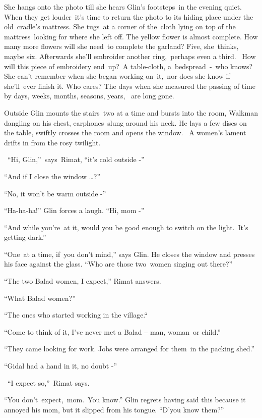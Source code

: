 \documentclass[twoside,11pt]{book}
\begin{document}
S{he hangs onto the photo till she hears Glin's footsteps\ in the
evening quiet. When }they get louder\ {it's time to return the photo
to its hiding place under the old\ cradle's mattress. She tugs\ at a corner of
the}{\ }cloth lying on top of the
mattress{\ looking for where she left off. The yellow flower is almost
complete. How many more flowers will she need}\ {to complete the
garland? Five, she\ }thinks{, maybe six. Afterwards she'll embroider
another }ring,\ p{erhaps even a third.~
}How{ will this piece of embroidery
end\ }up?{\ }A{
table{}-cloth,} a\ {bedspread\ {}-\ who knows? She can't remember when
she began working on\ }it,\ nor does she know if she'll\ {ever finish
it. Who cares? }The days when she measured the passing of time by days, weeks, months, seasons, years, \ are long
gone.\ 

{Outside Glin }mounts the
stairs\ {two at a time and bursts into the room, Walkman dangling on
his chest, earphones~}slung{ around his neck. He lays a few discs on
the table, swiftly crosses the room and opens the window.~ A women's lament drifts in from the rosy twilight.}

{\ {}``}Hi,{
Glin,''\ says\ Rimat, ``it's cold outside -{}''}

``And if I{ close the window {\dots}?{}''}

{}``No, it won't be warm outside -{}''

{{}``Ha-ha-ha!'' Glin }forces a
laugh{. ``Hi, mom -{}''\ }

{{}``And while you're\ at it, }would you be good enough to switch on
the light.\ {It's getting dark.{}''}

{{}``One~at a time, if~you }don't
mind{,'' says Glin. He closes the window and presses his face against
the glass}.{ ``Who are those
}two{\ }{women singing out
there?''}

{{}``The two Balad women, I
}expect{,'' Rimat answers.}

{}``What Balad women?''

``The ones who started working{ in the
village.``\ \ \ \ \ \ \ \ }

{``Come to think of it, I've never met a Balad -- man,
woman\ }or child.''

{{}``They came looking for work. Jobs were arranged for them\ in the
packing }shed{.''}

{}``Gidal had a hand in it, no doubt -{}''

{~``}I expect
so{,''~Rimat says.\ }

{{}``You
don't~}expect,~mom{.~You know.'' Glin regrets having said
this because it annoyed his  mom, but it slipped from his tongue.
``}D{}'y{ou know them?''\ }
\end{document}
